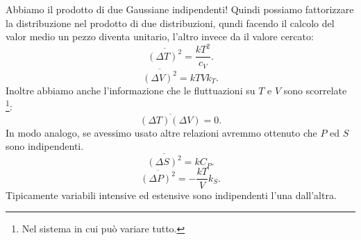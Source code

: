 Abbiamo il prodotto di due Gaussiane indipendenti! Quindi possiamo fattorizzare la distribuzione nel prodotto di due distribuzioni, qundi facendo il calcolo del valor medio un pezzo diventa unitario, l'altro invece da il valore cercato:
\[
	\overline{\left( \Delta T \right) ^2} = \frac{kT^2}{c_{V}}
.\] 
\[
	\overline{\left( \Delta V \right) ^2} = kTVk_{T}
.\] 
Inoltre abbiamo anche l'informazione che le fluttuazioni su $T$ e $V$ sono scorrelate \footnote{Nel sistema in cui può variare tutto.}:
\[
	\overline{\left( \Delta T \right) \left( \Delta V \right) }= 0
.\] 
In modo analogo, se avessimo usato altre relazioni avremmo ottenuto che $P$ ed $S$ sono indipendenti.
\[
	\overline{\left( \Delta S \right) ^2} = kC_{P}
.\] 
\[
	\overline{\left( \Delta P \right) ^2} = - \frac{kT}{V}k_{S}
.\] 
Tipicamente variabili intensive ed estensive sono indipendenti l'una dall'altra.
